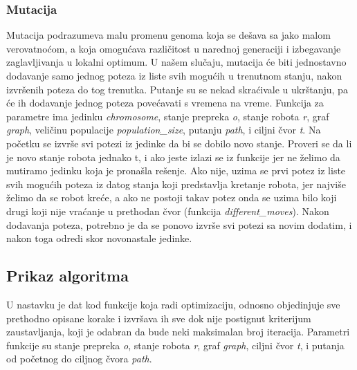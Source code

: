 \documentclass[12pt]{article}
\begin{document}
	
	
	
	\subsubsection{Mutacija}
	\label{subsec:podnaslov3}
	
	Mutacija podrazumeva malu promenu genoma koja se dešava sa jako malom verovatnoćom, a koja omogućava različitost u narednoj generaciji i izbegavanje zaglavljivanja u lokalni optimum. U našem slučaju, mutacija će biti jednostavno dodavanje samo jednog poteza iz liste svih mogućih u trenutnom stanju, nakon izvršenih poteza do tog trenutka. Putanje su se nekad skraćivale u ukrštanju, pa će ih dodavanje jednog poteza povećavati s vremena na vreme. Funkcija za parametre ima jedinku \textit{chromosome}, stanje prepreka \textit{o}, stanje robota \textit{r}, graf \textit{graph}, veličinu populacije \textit{population\_size}, putanju \textit{path}, i ciljni čvor \textit{t}. Na početku se izvrše svi potezi iz jedinke da bi se dobilo novo stanje. Proveri se da li je novo stanje robota jednako t, i ako jeste izlazi se iz funkcije jer ne želimo da mutiramo jedinku koja je pronašla rešenje. Ako nije, uzima se prvi potez iz liste svih mogućih poteza iz datog stanja koji predstavlja kretanje robota, jer najviše želimo da se robot kreće, a ako ne postoji takav potez onda se uzima bilo koji drugi koji nije vraćanje u prethodan čvor (funkcija \textit{different\_moves}). Nakon dodavanja poteza, potrebno je da se ponovo izvrše svi potezi sa novim dodatim, i nakon toga odredi skor novonastale jedinke. 
	\vspace*{1\baselineskip}
	
	


	\subsection{Prikaz algoritma}
	\label{sec:cetvrtoPoglavlje}
	U nastavku je dat kod funkcije koja radi optimizaciju, odnosno objedinjuje sve prethodno opisane korake i izvršava ih sve dok nije postignut kriterijum zaustavljanja, koji je odabran da bude neki maksimalan broj iteracija. Parametri funkcije su stanje prepreka \textit{o}, stanje robota \textit{r}, graf \textit{graph}, ciljni čvor \textit{t}, i putanja od početnog do ciljnog čvora \textit{path}.
	\vspace*{2\baselineskip}
	
\end{document}
